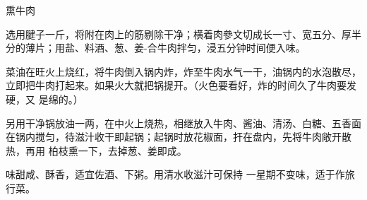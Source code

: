 \begin{recipe}{熏牛肉}

\ingredients


\preparation

\step 选用腱子一斤，将附在肉上的筋剔除干净；横着肉參文切成长一寸、宽五分、厚半
分的薄片；用盐、料酒、葱、姜-合牛肉拌匀，浸五分钟时间便入味。

\step 菜油在旺火上烧红，将牛肉倒入锅内炸，炸至牛肉水气一干，油锅内的水泡散尽，
立即把牛肉打起来。如果火大就把锅提开。（火色要看好，炸的时间久了牛肉要发硬，又
是绵的。）

\step 另用干净锅放油一两，在中火上烧热，相继放入牛肉、酱油、清汤、白糖、五香面
在锅内搅匀，待滋汁收干即起锅；起锅时放花椒面，扞在盘内，先将牛肉敞开散热，再用
柏枝熏一下，去掉葱、姜即成。

\features

味甜咸、酥香，适宜佐酒、下粥。用清水收滋汁可保持 一星期不变味，适于作旅行菜。

\end{recipe}

